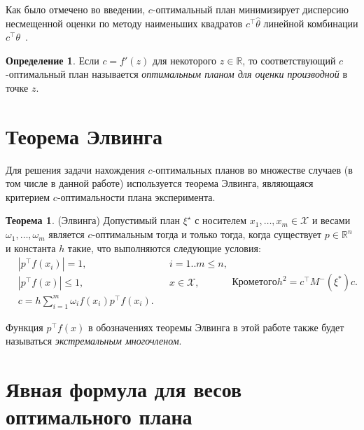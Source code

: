 \documentclass[specialist,
               substylefile = spbu.rtx,
               subf,href,colorlinks=true, 12pt]{disser}
\theoremstyle{definition}
\newtheorem{definition}{Определение}
\newtheorem{theorem}{Теорема}
\newcommand\abs[1]{\left\lvert#1\right\rvert}
\begin{document}
  Как было отмечено во введении, $c$-оптимальный план минимизирует дисперсию несмещенной оценки по методу наименьших квадратов $c^\top \hat{\theta}$ линейной комбинации $c^\top \theta$~\cite{dette1993_2}.
 
  \begin{definition}
  Если $c = f'(z)$ для некоторого $z \in \mathbb{R}$, то соответствующий $c$-оп\-ти\-маль\-ный план называется \textit{оптимальным планом для оценки производной} в точке $z$.
  \end{definition}
  
  \section{Теорема Элвинга}
  
  Для решения задачи нахождения $c$-оптимальных планов во множестве случаев (в том числе в данной работе) используется теорема Элвинга, являющаяся критерием $c$-оптимальности плана эксперимента.
  \begin{theorem}
  \label{th:elfving}
  (Элвинга) \cite{melas2010}
  Допустимый план $\xi^\star$ с носителем $x_1, \ldots, x_m \in \mathcal{X}$ и весами $\omega_1, \ldots, \omega_m$ является $c$-оптимальным тогда и только тогда, когда существует $p \in \mathbb{R}^n$ и константа $h$ такие, что выполняются следующие условия:
  \begin{subequations}
  \label{eq:elfving}
  \begin{align}
	&\abs{p^\top f(x_i)} = 1, &&i=1..m \leqslant n \label{eq:elfving:eq1} ,\\
	&\abs{p^\top f(x)} \leqslant 1,  &&x \in \mathcal{X} \label{eq:elfving:eq2} ,\\
	&c = h \sum_{i=1}^m \omega_i f(x_i) p^\top f(x_i) \label{eq:elfving:eq3}.
  \end{align}
  Кроме того
  \begin{equation*}
  	h^2 = c^\top M^{-}(\xi^{*})c.
  \end{equation*}
  \end{subequations}
  \end{theorem}
	Функция $p^\top f(x)$ в обозначениях теоремы Элвинга в этой работе также будет называться \textit{экстремальным многочленом}.
	
	\section{Явная формула для весов оптимального плана}
	
\end{document}
